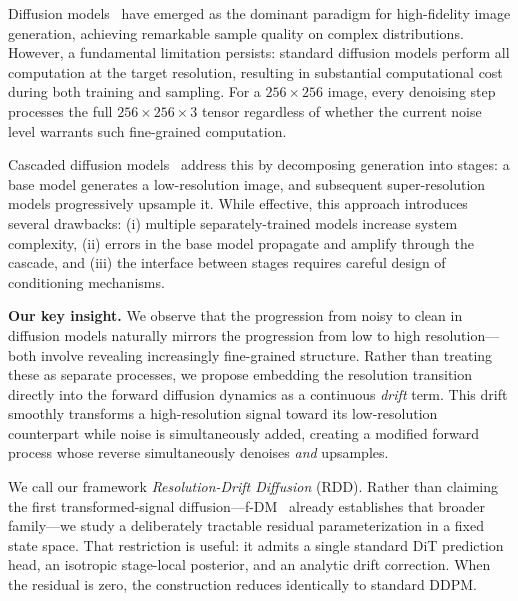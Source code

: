 \documentclass[10pt]{article}
\begin{document}
Diffusion models~\citep{ho2020ddpm,song2021sde} have emerged as the dominant paradigm for high-fidelity image generation, achieving remarkable sample quality on complex distributions.
However, a fundamental limitation persists: standard diffusion models perform all computation at the target resolution, resulting in substantial computational cost during both training and sampling.
For a $256\times256$ image, every denoising step processes the full $256\times256\times3$ tensor regardless of whether the current noise level warrants such fine-grained computation.

Cascaded diffusion models~\citep{ho2022cdm,saharia2022imagen,ramesh2022dalle2} address this by decomposing generation into stages: a base model generates a low-resolution image, and subsequent super-resolution models progressively upsample it.
While effective, this approach introduces several drawbacks: (i) multiple separately-trained models increase system complexity, (ii) errors in the base model propagate and amplify through the cascade, and (iii) the interface between stages requires careful design of conditioning mechanisms.

\textbf{Our key insight.}
We observe that the progression from noisy to clean in diffusion models naturally mirrors the progression from low to high resolution---both involve revealing increasingly fine-grained structure.
Rather than treating these as separate processes, we propose embedding the resolution transition directly into the forward diffusion dynamics as a continuous \emph{drift} term.
This drift smoothly transforms a high-resolution signal toward its low-resolution counterpart while noise is simultaneously added, creating a modified forward process whose reverse simultaneously denoises \emph{and} upsamples.

We call our framework \emph{Resolution-Drift Diffusion} (RDD).
Rather than claiming the first transformed-signal diffusion---f-DM~\citep{gu2022fdm} already establishes that broader family---we study a deliberately tractable residual parameterization in a fixed state space.
That restriction is useful: it admits a single standard DiT prediction head, an isotropic stage-local posterior, and an analytic drift correction.
When the residual is zero, the construction reduces identically to standard DDPM.
\end{document}
